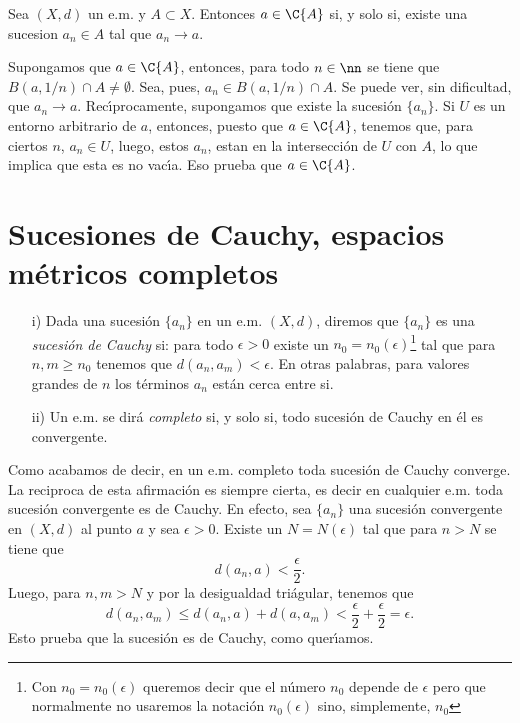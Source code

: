 \begin{proposicion} Sea $(X,d)$ un e.m. y $A\subset X$. Entonces
$a\in\C{A}$ si, y solo si, existe una sucesion $a_n\in A$ tal que
$a_n\rightarrow a$.
\end{proposicion}
\begin{demo} Supongamos que $a\in\C{A}$, entonces, para todo
$n\in\nn$ se tiene que $B(a,1/n)\cap A\neq\emptyset$. Sea, pues,
$a_n\in B(a,1/n)\cap A$. Se puede ver, sin dificultad, que
$a_n\rightarrow a$. Rec\'{\i}procamente, supongamos que existe la
sucesi\'on $\{a_n\}$. Si $U$ es un entorno arbitrario de $a$,
entonces, puesto que $a\in\C{A}$, tenemos que, para ciertos $n$,
$a_n\in U$, luego, estos $a_n$, estan en la intersecci\'on de $U$
con $A$, lo que implica que esta es no vac\'{\i}a. Eso prueba que
$a\in\C{A}$.
\end{demo}

\section{Sucesiones de Cauchy, espacios m\'etricos completos}


\begin{definicion}
\begin{itemize}
\item[i)]Dada una sucesi\'on $\{a_n\}$ en un e.m. $(X,d)$, diremos que
$\{a_n\}$ es una \emph{sucesi\'on de Cauchy} si: para todo
$\epsilon>0$ existe un $n_0=n_0(\epsilon)$\footnote{Con
$n_0=n_0(\epsilon)$ queremos decir que el n\'umero $n_0$ depende
de $\epsilon$ pero que normalmente no usaremos la notaci\'on
$n_0(\epsilon)$ sino, simplemente, $n_0$} tal que para $n,m\geq
n_0$ tenemos que $d(a_n,a_m)<\epsilon$. En otras palabras, para
valores grandes de $n$ los t\'erminos $a_n$ est\'an cerca entre
si.
\item[ii)] Un e.m. se dir\'a \emph{completo} si, y solo si, todo
sucesi\'on de Cauchy en \'el es convergente.
\end{itemize}
\end{definicion}


Como acabamos de decir, en un e.m. completo toda sucesi\'on de
Cauchy converge. La reciproca de esta afirmaci\'on es siempre
cierta, es decir en cualquier e.m. toda sucesi\'on convergente es
de Cauchy. En efecto, sea $\{a_n\}$ una sucesi\'on convergente en
$(X,d)$ al punto $a$ y sea  $\epsilon > 0$. Existe un
$N=N(\epsilon)$ tal que para $n>N$ se tiene que
\[
    d(a_n,a)<\frac{\epsilon}{2}.
\]
Luego, para $n,m>N$ y por la desigualdad tri\'agular, tenemos que
\[
    d(a_n,a_m)\leq d(a_n,a)+d(a,a_m)<\frac{\epsilon}{2}+\frac{\epsilon}{2}=\epsilon.
\]
Esto prueba que la sucesi\'on es de Cauchy, como quer\'{\i}amos.

